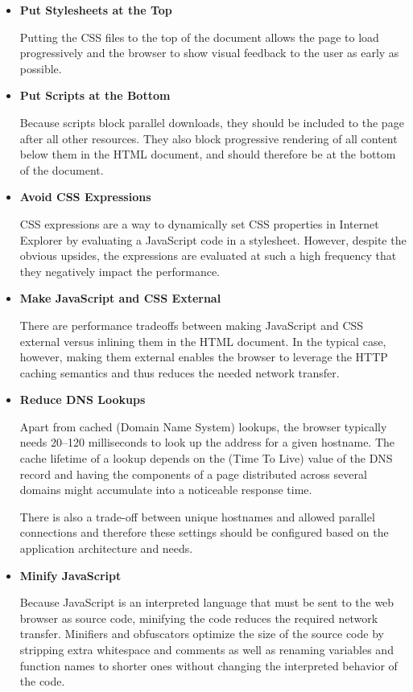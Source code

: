 \begin{itemize}
\item \textbf{Put Stylesheets at the Top}

  Putting the CSS files to the top of the document allows the page to
  load progressively and the browser to show visual feedback to the
  user as early as possible.

\item \textbf{Put Scripts at the Bottom}

  Because scripts block parallel downloads, they should be included to
  the page after all other resources. They also block progressive
  rendering of all content below them in the HTML document, and should
  therefore be at the bottom of the document.

\item \textbf{Avoid CSS Expressions}

  CSS expressions are a way to dynamically set CSS properties in
  Internet Explorer by evaluating a JavaScript code in a
  stylesheet. However, despite the obvious upsides, the expressions
  are evaluated at such a high frequency that they negatively impact
  the performance.

\item \textbf{Make JavaScript and CSS External}

  There are performance tradeoffs between making JavaScript and CSS
  external versus inlining them in the HTML document. In the typical
  case, however, making them external enables the browser to leverage
  the HTTP caching semantics and thus reduces the needed network
  transfer.

\item \textbf{Reduce DNS Lookups}

  Apart from cached  (Domain Name System) lookups, the
  browser typically needs 20--120 milliseconds to look up the
   address for a given hostname. The cache lifetime of a
  lookup depends on the  (Time To Live) value of the DNS
  record and having the components of a page distributed across
  several domains might accumulate into a noticeable response time.

  There is also a trade-off between unique hostnames and allowed
  parallel connections and therefore these settings should be
  configured based on the application architecture and needs.

\item \textbf{Minify JavaScript}

  Because JavaScript is an interpreted language that must be sent to
  the web browser as source code, minifying the code reduces the
  required network transfer. Minifiers and obfuscators optimize the
  size of the source code by stripping extra whitespace and comments
  as well as renaming variables and function names to shorter ones
  without changing the interpreted behavior of the code.


\end{itemize}
